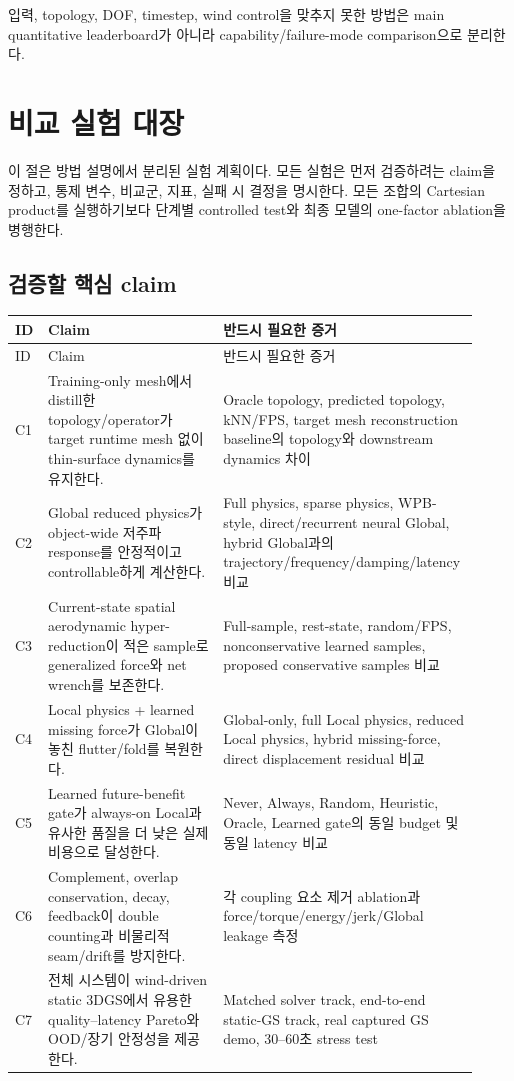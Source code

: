 \documentclass[11pt,a4paper]{article}
\begin{document}
입력, topology, DOF, timestep, wind control을 맞추지 못한 방법은
main quantitative leaderboard가 아니라 capability/failure-mode comparison으로 분리한다.

\clearpage
\section{비교 실험 대장}

이 절은 방법 설명에서 분리된 실험 계획이다.
모든 실험은 먼저 검증하려는 claim을 정하고,
통제 변수, 비교군, 지표, 실패 시 결정을 명시한다.
모든 조합의 Cartesian product를 실행하기보다
단계별 controlled test와 최종 모델의 one-factor ablation을 병행한다.

\subsection{검증할 핵심 claim}

\begin{longtable}{L{0.07\linewidth}L{0.37\linewidth}L{0.48\linewidth}}
\toprule
ID & Claim & 반드시 필요한 증거 \\
\midrule
\endfirsthead
\toprule
ID & Claim & 반드시 필요한 증거 \\
\midrule
\endhead
C1 & Training-only mesh에서 distill한 topology/operator가 target runtime mesh 없이 thin-surface dynamics를 유지한다.
& Oracle topology, predicted topology, kNN/FPS, target mesh reconstruction baseline의 topology와 downstream dynamics 차이 \\
\addlinespace
C2 & Global reduced physics가 object-wide 저주파 response를 안정적이고 controllable하게 계산한다.
& Full physics, sparse physics, WPB-style, direct/recurrent neural Global, hybrid Global과의 trajectory/frequency/damping/latency 비교 \\
\addlinespace
C3 & Current-state spatial aerodynamic hyper-reduction이 적은 sample로 generalized force와 net wrench를 보존한다.
& Full-sample, rest-state, random/FPS, nonconservative learned samples, proposed conservative samples 비교 \\
\addlinespace
C4 & Local physics + learned missing force가 Global이 놓친 flutter/fold를 복원한다.
& Global-only, full Local physics, reduced Local physics, hybrid missing-force, direct displacement residual 비교 \\
\addlinespace
C5 & Learned future-benefit gate가 always-on Local과 유사한 품질을 더 낮은 실제 비용으로 달성한다.
& Never, Always, Random, Heuristic, Oracle, Learned gate의 동일 budget 및 동일 latency 비교 \\
\addlinespace
C6 & Complement, overlap conservation, decay, feedback이 double counting과 비물리적 seam/drift를 방지한다.
& 각 coupling 요소 제거 ablation과 force/torque/energy/jerk/Global leakage 측정 \\
\addlinespace
C7 & 전체 시스템이 wind-driven static 3DGS에서 유용한 quality--latency Pareto와 OOD/장기 안정성을 제공한다.
& Matched solver track, end-to-end static-GS track, real captured GS demo, 30--60초 stress test \\
\bottomrule
\end{longtable}
\end{document}

